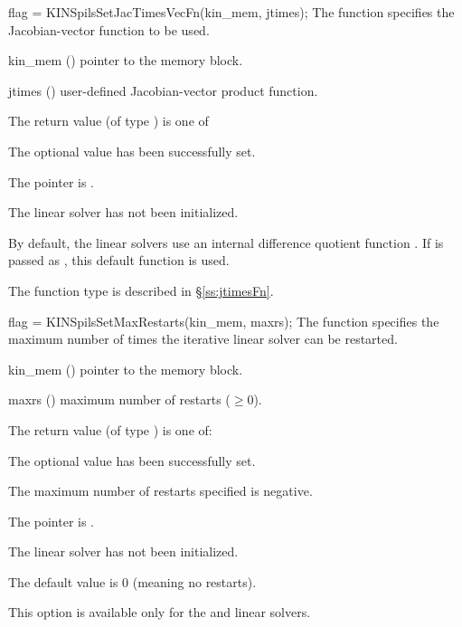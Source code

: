 {
  flag = KINSpilsSetJacTimesVecFn(kin\_mem, jtimes);
}
{
  The function  specifies the Jacobian-vector 
  function to be used.
}
{
  \begin{args}
  \item[kin\_mem] ()
    pointer to the {\kinsol} memory block.
  \item[jtimes] ()
    user-defined Jacobian-vector product function.
  \end{args}
}
{
  The return value  (of type ) is one of
  \begin{args}
  \item[\Id{KINSPILS\_SUCCESS}] 
    The optional value has been successfully set.
  \item[\Id{KINSPILS\_MEM\_NULL}]
    The  pointer is .
  \item[\Id{KINSPILS\_LMEM\_NULL}]
    The {\kinspils} linear solver has not been initialized.
  \end{args}
}
{
  By default, the {\kinspils} linear solvers use an internal difference quotient 
  function .
  If  is passed as , this default function is used.

  The function type  is described in \S\ref{ss:jtimesFn}.
}
{
  flag = KINSpilsSetMaxRestarts(kin\_mem, maxrs);
}
{
  The function  specifies the maximum
  number of times the iterative linear solver can be restarted.
}
{
  \begin{args}
  \item[kin\_mem] ()
    pointer to the {\kinsol} memory block.
  \item[maxrs] ()
    maximum number of restarts ($\geq 0$).
  \end{args}
}
{
  The return value  (of type ) is one of:
  \begin{args}
  \item[\Id{KINSPILS\_SUCCESS}] 
    The optional value has been successfully set.
  \item[\Id{KINSPILS\_ILL\_INPUT}]
    The maximum number of restarts specified is negative.
  \item[\Id{KINSPILS\_MEM\_NULL}]
    The  pointer is .
  \item[\Id{KINSPILS\_LMEM\_NULL}]
    The linear solver has not been initialized.
  \end{args}
}
{
  The default value is $0$ (meaning no restarts).

  {\warn}This option is available only for the {\kinspgmr} and {\kinspfgmr} 
  linear solvers.
}

